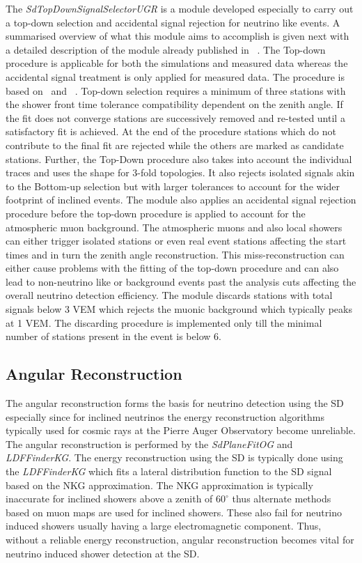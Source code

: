 The \textit{SdTopDownSignalSelectorUGR} is a module developed especially to carry out a top-down selection and accidental signal rejection for neutrino like events. A summarised overview of what this module aims to accomplish is given next with a detailed description of the module already published in ~\cite{}. The Top-down procedure is applicable for both the simulations and measured data whereas the accidental signal treatment is only applied for measured data. The procedure is based on~\cite{} and ~\cite{}. Top-down selection requires a minimum of three stations with the shower front time tolerance compatibility dependent on the zenith angle. If the fit does not converge stations are successively removed and re-tested until a satisfactory fit is achieved. At the end of the procedure stations which do not contribute to the final fit are rejected while the others are marked as candidate stations. Further, the Top-Down procedure also takes into account the individual traces and uses the shape for 3-fold topologies. It also rejects isolated signals akin to the Bottom-up selection but with larger tolerances to account for the wider footprint of inclined events. The module also applies an accidental signal rejection procedure before the top-down procedure is applied to account for the atmospheric muon background. The atmospheric muons and also local showers can either trigger isolated stations or even real event stations affecting the start times and in turn the zenith angle reconstruction. This miss-reconstruction can either cause problems with the fitting of the top-down procedure and can also lead to non-neutrino like or background events past the analysis cuts affecting the overall neutrino detection efficiency. The module discards stations with total signals below 3 VEM which rejects the muonic background which typically peaks at 1 VEM. The discarding procedure is implemented only till the minimal number of stations present in the event is below 6. 


\subsection{Angular Reconstruction}
\label{subsec:reco_presel}

The angular reconstruction forms the basis for neutrino detection using the SD especially since for inclined neutrinos the energy reconstruction algorithms typically used for cosmic rays at the Pierre Auger Observatory become unreliable. The angular reconstruction is performed by the \textit{SdPlaneFitOG} and \textit{LDFFinderKG}. The energy reconstruction using the SD is typically done using the \textit{LDFFinderKG} which fits a lateral distribution function to the SD signal based on the NKG approximation. The NKG approximation is typically inaccurate for inclined showers above a zenith of $60^{\circ}$ thus alternate methods based on muon maps are used for inclined showers. These also fail for neutrino induced showers usually having a large electromagnetic component. Thus, without a reliable energy reconstruction, angular reconstruction becomes vital for neutrino induced shower detection at the SD. 

